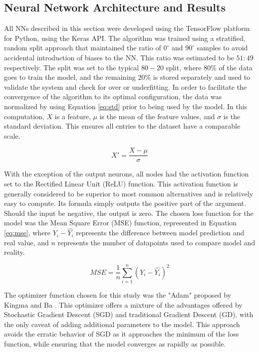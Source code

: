 \documentclass[main.tex]{subfiles}
\begin{document}
\subsection{Neural Network Architecture and Results}\label{ssec:MLA}

All NNs described in this section were developed using the TensorFlow platform for Python, using the Keras API. The algorithm was trained using a stratified, random split approach that maintained the ratio of $0^{\circ}$ and $90^{\circ}$ samples to avoid accidental introduction of biases to the NN. This ratio was estimated to be  $51:49$ respectively. The split was set to the typical $80-20$ split, where $80\%$ of the data goes to train the model, and the remaining $20\%$ is stored separately and used to validate the system and check for over or underfitting. In order to facilitate the convergence of the algorithm to its optimal configuration, the data was normalized by using Equation \ref{eq:std} prior to being used by the model. In this computation, $X$ is a feature, $\mu$ is the mean of the feature values, and $\sigma$ is the standard deviation. This ensures all entries to the dataset have a comparable scale.

\begin{equation} \label{eq:std}
	X' = \frac{X-\mu}{\sigma}
\end{equation} 

With the exception of the output neurons, all nodes had the activation function set to the Rectified Linear Unit (ReLU) function. This activation function is generally considered to be superior to most common alternatives and is relatively easy to compute. Its formula simply outputs the positive part of the argument. Should the input be negative, the output is zero. The chosen loss function for the model was the Mean Square Error (MSE) function, represented in Equation \ref{eq:mse}, where $Y_{i}-\hat{Y_{i}}$ represents the difference between model prediction and real value, and $n$ represents the number of datapoints used to compare model and reality. 

\begin{equation} \label{eq:mse}
	MSE = \frac{1}{n}\sum_{i=1}^{n} (Y_{i}-\hat{Y_{i}})^2
\end{equation}

The optimizer function chosen for this study was the "Adam" proposed by Kingma and Ba \cite{kingma2017adam}. This optimizer offers a mixture of the advantages offered by Stochastic Gradient Descent (SGD) and traditional Gradient Descent (GD), with the only caveat of adding additional parameters to the model. This approach avoids the erratic behavior of SGD as it approaches the minimum of the loss function, while ensuring that the model converges as rapidly as possible.
\end{document}
